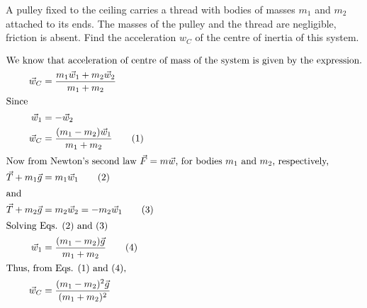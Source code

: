 \item A pulley fixed to the ceiling carries a thread with bodies of masses $m_1$ and $m_2$ attached to its ends. The masses of the pulley and the thread are negligible, friction is absent. Find the acceleration $w_C$ of the centre of inertia of this system.
\begin{solution}
    \begin{center}
    \end{center}
    
    \begin{align*}
        \intertext{We know that acceleration of centre of mass of the system is given by the expression.}
        \vec{w}_C &= \dfrac{m_1\vec{w}_1 + m_2\vec{w}_2}{m_1 + m_2} \\
        \intertext{Since}
        \vec{w}_1 &= -\vec{w}_2 \\
        \vec{w}_C &= \dfrac{(m_1 - m_2)\vec{w}_1}{m_1 + m_2} \tag{1} \\
        \intertext{Now from Newton's second law $\vec{F}= m\vec{w}$, for bodies $m_1$ and $m_2$, respectively,}
        \vec{T} + m_1\vec{g} &= m_1\vec{w}_1 \tag{2} \\
        \intertext{and}
        \vec{T} + m_2\vec{g} &= m_2\vec{w}_2 = -m_2\vec{w}_1 \tag{3} \\
        \intertext{Solving Eqs. (2) and (3)}
        \vec{w}_1 &= \dfrac{(m_1 - m_2)\vec{g}}{m_1 + m_2} \tag{4} \\
        \intertext{Thus, from Eqs. (1) and (4),}
        \vec{w}_C &= \dfrac{(m_1 - m_2)^2\vec{g}}{(m_1 + m_2)^2}
    \end{align*}
\end{solution}
